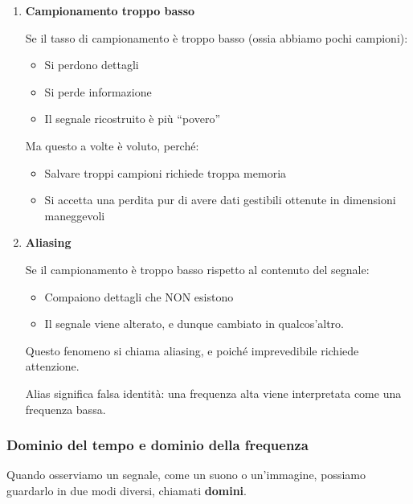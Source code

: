 \documentclass[
]{article}
\providecommand{\tightlist}{%
  \setlength{\itemsep}{0pt}\setlength{\parskip}{0pt}}
\begin{document}
\begin{enumerate}
\def\labelenumi{\arabic{enumi}.}
\item
  \textbf{Campionamento troppo basso}

  Se il tasso di campionamento è troppo basso (ossia abbiamo pochi campioni):

  \begin{itemize}
  \tightlist
  \item
    Si perdono dettagli
  \item
    Si perde informazione
  \item
    Il segnale ricostruito è più ``povero''
  \end{itemize}

  Ma questo a volte è voluto, perché:

  \begin{itemize}
  \tightlist
  \item
    Salvare troppi campioni richiede troppa memoria
  \item
    Si accetta una perdita pur di avere dati gestibili ottenute in dimensioni maneggevoli
  \end{itemize}
\item
  \textbf{Aliasing}

  Se il campionamento è troppo basso rispetto al contenuto del segnale:

  \begin{itemize}
  \tightlist
  \item
    Compaiono dettagli che NON esistono
  \item
    Il segnale viene alterato, e dunque cambiato in qualcos'altro.
  \end{itemize}

  Questo fenomeno si chiama aliasing, e poiché imprevedibile richiede attenzione.

  Alias significa falsa identità: una frequenza alta viene interpretata come una frequenza bassa.
\end{enumerate}

\hypertarget{dominio-del-tempo-e-dominio-della-frequenza}{%
\subsubsection{Dominio del tempo e dominio della frequenza}\label{dominio-del-tempo-e-dominio-della-frequenza}}

Quando osserviamo un segnale, come un suono o un'immagine, possiamo guardarlo in due modi diversi, chiamati \textbf{domini}.
\end{document}
